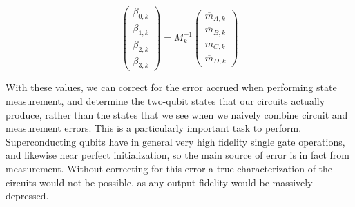 \begin{equation}
\begin{pmatrix} \beta_{0,k} \\ \beta_{1,k} \\ \beta_{2,k} \\ \beta_{3,k}
\end{pmatrix}=M_k^{-1}
\begin{pmatrix} \overline{m}_{A,k} \\ \overline{m}_{B,k} \\ \overline{m}_{C,k}
\\ \overline{m}_{D,k}
\end{pmatrix}
\end{equation}

With these values, we can correct for the error accrued when performing state
measurement, and determine the two-qubit states that our circuits actually
produce, rather than the states that we see when we naively combine circuit and
measurement errors. This is a particularly important task to perform.
Superconducting qubits have in general very high fidelity single gate operations,
and likewise near perfect initialization, so the main source of error is in fact
from measurement. Without correcting for this error a true characterization of
the circuits would not be possible, as any output fidelity would be massively
depressed. 

